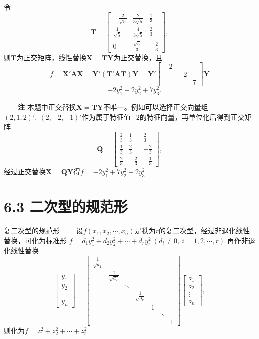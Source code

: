 \documentclass[compress,mathserif,cjk]{beamer}
\theoremstyle{remark}
\numberwithin{equation}{section}
\newcommand{\hei}{\bf}      %
\begin{document}
\begin{CJK}{UTF8}{gbsn}
\begin{frame}
令
$$\bm T=\left[\begin{matrix}-\frac{2}{\sqrt 5}&\frac{2}{3\sqrt 5}&\frac{1}3\\[0.5em]\frac{1}{\sqrt 5}&\frac{4}{3\sqrt 5}&\frac{2}3\\[0.5em]0&\frac{\sqrt 5}3&-\frac{2}3\end{matrix}\right],$$
则$\bm T$为正交矩阵，线性替换$\bm X=\bm T\bm Y$为正交替换，且
$$f=\bm X'\bm{AX}=\bm Y'(\bm T'\bm{AT})\bm Y=\bm Y'\left[\begin{matrix}-2&&\\&-2&\\&&7\end{matrix}\right]\bm Y$$ $$=-2y_1^2-2y_2^2+7y_3^2.$$
\end{frame}

\begin{frame}
\ \ \ \ {\hei 注} 本题中正交替换$\bm X=\bm T\bm Y$不唯一。例如可以选择正交向量组$(2,1,2)',~(2,-2,-1)'$作为属于特征值$-2$的特征向量，再单位化后得到正交矩阵
$$\bm Q=\left[\begin{matrix}\frac{2}3&\frac{1}3&\frac{2}3\\[0.3em]\frac{1}3&\frac{2}3&-\frac{2}3\\[0.3em]\frac{2}3&-\frac{2}3&-\frac{1}3\end{matrix}\right],$$
经过正交替换$\bm X=\bm Q\bm Y$得$f=-2y_1^2+7y_2^2-2y_3^2$.
\end{frame}

\section[6.3]{6.3 二次型的规范形}

\begin{frame}{复二次型的规范形}
\pause\ \ \ \ 设$f(x_1,x_2,\cdots,x_n)$是秩为$r$的复二次型，经过非退化线性替换，可化为标准形
$f=d_1y_1^2+d_2y_2^2+\cdots+d_ry_r^2~(d_i\neq0,~i=1,2,\cdots,r)$
再作非退化线性替换
$$\left[\begin{matrix}y_1\\y_2\\\vdots\\y_n\end{matrix}\right]=\left[\begin{matrix}\frac{1}{\sqrt{d_1}}&&&&&&\\&\frac{1}{\sqrt{d_2}}&&&&&\\&&\ddots&&&&\\&&&\frac{1}{\sqrt{d_r}}&&&\\
&&&&1&&\\&&&&&\ddots&\\&&&&&&1\end{matrix}\right]\left[\begin{matrix}z_1\\z_2\\\vdots\\z_n\end{matrix}\right],$$
则化为$f=z_1^2+z_2^2+\cdots+z_r^2$.
\end{frame}


\end{CJK}
\end{document}
